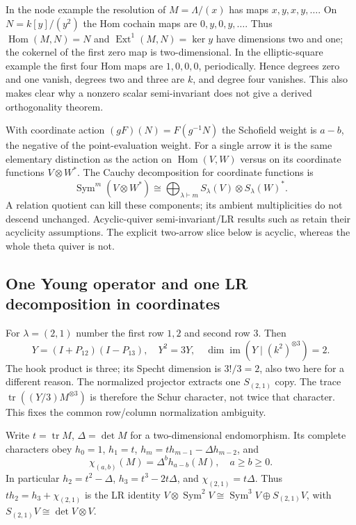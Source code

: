 \documentclass[11pt]{article}
\theoremstyle{definition}\newtheorem{definition}[theorem]{Definition}
\theoremstyle{remark}\newtheorem{remark}[theorem]{Remark}
\DeclareMathOperator{\tr}{tr}\DeclareMathOperator{\Rea}{Re}
\begin{document}
In the node example the resolution of $M=\Lambda/(x)$ has maps $x,y,x,y,\ldots$. On $N=k[y]/(y^2)$ the Hom cochain maps are $0,y,0,y,\ldots$. Thus $\operatorname{Hom}(M,N)=N$ and $\operatorname{Ext}^1(M,N)=\ker y$ have dimensions two and one; the cokernel of the first zero map is two-dimensional. In the elliptic-square example the first four Hom maps are $1,0,0,0$, periodically. Hence degrees zero and one vanish, degrees two and three are $k$, and degree four vanishes. This also makes clear why a nonzero scalar semi-invariant does not give a derived orthogonality theorem.

With coordinate action $(gF)(N)=F(g^{-1}N)$ the Schofield weight is $a-b$, the negative of the point-evaluation weight. For a single arrow it is the same elementary distinction as the action on $\operatorname{Hom}(V,W)$ versus on its coordinate functions $V\otimes W^*$. The Cauchy decomposition for coordinate functions is
\[
 \operatorname{Sym}^m(V\otimes W^*)\cong
 \bigoplus_{\lambda\vdash m}S_\lambda(V)\otimes S_\lambda(W)^*.
\]
A relation quotient can kill these components; its ambient multiplicities do not descend unchanged. Acyclic-quiver semi-invariant/LR results such as \cite{DerksenWeyman} retain their acyclicity assumptions. The explicit two-arrow slice below is acyclic, whereas the whole theta quiver is not.

\subsection{One Young operator and one LR decomposition in coordinates}
For $\lambda=(2,1)$ number the first row $1,2$ and second row $3$. Then
\[
 Y=(I+P_{12})(I-P_{13}),\quad Y^2=3Y,\quad
 \dim\operatorname{im}(Y\mid(k^2)^{\otimes3})=2.
\]
The hook product is three; its Specht dimension is $3!/3=2$, also two here for a different reason. The normalized projector extracts one $S_{(2,1)}$ copy. The trace $\tr((Y/3)M^{\otimes3})$ is therefore the Schur character, not twice that character. This fixes the common row/column normalization ambiguity.

Write $t=\tr M$, $\Delta=\det M$ for a two-dimensional endomorphism. Its complete characters obey $h_0=1$, $h_1=t$, $h_m=th_{m-1}-\Delta h_{m-2}$, and
\[
 \chi_{(a,b)}(M)=\Delta^b h_{a-b}(M),\quad a\ge b\ge0.
\]
In particular $h_2=t^2-\Delta$, $h_3=t^3-2t\Delta$, and $\chi_{(2,1)}=t\Delta$. Thus $t h_2=h_3+\chi_{(2,1)}$ is the LR identity $V\otimes\operatorname{Sym}^2V\cong\operatorname{Sym}^3V\oplus S_{(2,1)}V$, with $S_{(2,1)}V\cong\det V\otimes V$.
\end{document}
